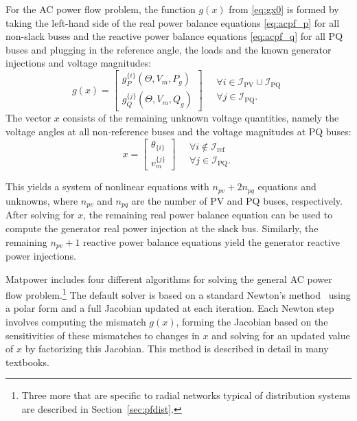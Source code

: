 \documentclass[12pt]{article}
\newcommand{\matpower}[0]{{\sc Matpower}}
\numberwithin{equation}{section}
\numberwithin{table}{section}
\numberwithin{figure}{section}
\begin{document}
For the AC power flow problem, the function $g(x)$ from \eqref{eq:gx0} is formed by taking the left-hand side of the real power balance equations \eqref{eq:acpf_p} for all non-slack buses and the reactive power balance equations \eqref{eq:acpf_q} for all PQ buses and plugging in the reference angle, the loads and the known generator injections and voltage magnitudes:
\begin{equation}
g(x) = \left[\begin{array}{c}
g_P^{\{i\}}(\Theta, V_m, P_g) \\
g_Q^{\{j\}}(\Theta, V_m, Q_g)
\end{array}\right] \quad
\begin{array}{l}
\forall i \in \mathcal{I}_\mathrm{PV} \cup \mathcal{I}_\mathrm{PQ} \\
\forall j \in \mathcal{I}_\mathrm{PQ}.
\end{array}
\label{eq:g_acpf}
\end{equation}
The vector $x$ consists of the remaining unknown voltage quantities, namely the voltage angles at all non-reference buses and the voltage magnitudes at PQ buses:
\begin{equation}
x = \left[\begin{array}{c}
\theta_{\{i\}} \\
v_m^{\{j\}}
\end{array}\right] \quad
\begin{array}{l}
\forall i \notin \mathcal{I}_\mathrm{ref} \\
\forall j \in \mathcal{I}_\mathrm{PQ}.
\end{array}
\label{eq:x_acpf}
\end{equation}

This yields a system of nonlinear equations with $n_{pv} + 2n_{pq}$ equations and unknowns, where $n_{pv}$ and $n_{pq}$ are the number of PV and PQ buses, respectively. After solving for $x$, the remaining real power balance equation can be used to compute the generator real power injection at the slack bus. Similarly, the remaining $n_{pv} + 1$ reactive power balance equations yield the generator reactive power injections.

\matpower{} includes four different algorithms for solving the general AC power flow problem.\footnote{Three more that are specific to radial networks typical of distribution systems are described in Section~\ref{sec:pfdist}.} The default solver is based on a standard Newton's method~\cite{tinney1967} using a polar form and a full Jacobian updated at each iteration. Each Newton step involves computing the mismatch $g(x)$, forming the Jacobian based on the sensitivities of these mismatches to changes in $x$ and solving for an updated value of $x$ by factorizing this Jacobian. This method is described in detail in many textbooks.
\end{document}
